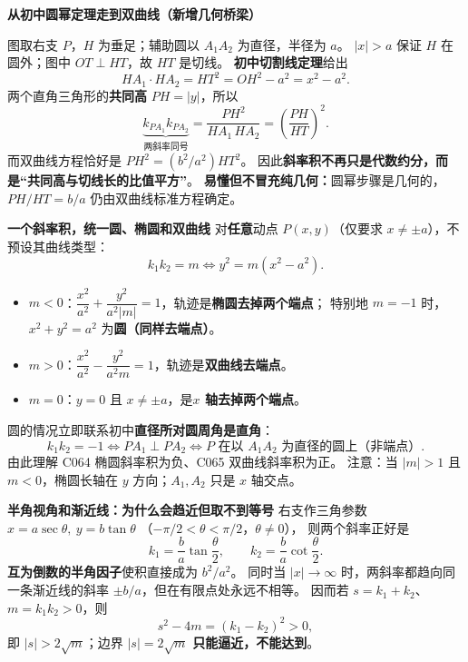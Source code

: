 \begin{explanationbox}
\textbf{\textcolor{CExplanation}{从初中圆幂定理走到双曲线（新增几何桥梁）}}
\begin{center}\end{center}
图取右支 $P$，$H$ 为垂足；辅助圆以 $A_1A_2$ 为直径，半径为 $a$。
$|x|>a$ 保证 $H$ 在圆外；图中 $OT\perp HT$，故 $HT$ 是切线。
\textbf{初中切割线定理}给出
\[
 HA_1\cdot HA_2=HT^2=OH^2-a^2=x^2-a^2.
\]
两个直角三角形的\textbf{共同高} $PH=|y|$，所以
\[
 \underbrace{k_{PA_1}k_{PA_2}}_{\text{两斜率同号}}
 =\frac{PH^2}{HA_1\,HA_2}
 =\boxed{\left(\frac{PH}{HT}\right)^2}.
\]
而双曲线方程恰好是 $PH^2=(b^2/a^2)HT^2$。
因此\textbf{斜率积不再只是代数约分，而是“共同高与切线长的比值平方”}。
\textbf{易懂但不冒充纯几何：}圆幂步骤是几何的，$PH/HT=b/a$ 仍由双曲线标准方程确定。

\medskip
\end{explanationbox}
\clearpage
\begin{explanationbox}
\textbf{\textcolor{CExplanation}{一个斜率积，统一圆、椭圆和双曲线}}
对\textbf{任意}动点 $P(x,y)$（仅要求 $x\ne\pm a$），不预设其曲线类型：
\[
 k_1k_2=m\iff y^2=m(x^2-a^2).
\]
\begin{itemize}[leftmargin=*,itemsep=.22em]
 \item $m<0$：$\dfrac{x^2}{a^2}+\dfrac{y^2}{a^2|m|}=1$，轨迹是\textbf{椭圆去掉两个端点}；
 特别地 $m=-1$ 时，$x^2+y^2=a^2$ 为\textbf{圆（同样去端点）}。
 \item $m>0$：$\dfrac{x^2}{a^2}-\dfrac{y^2}{a^2m}=1$，轨迹是\textbf{双曲线去端点}。
 \item $m=0$：$y=0$ 且 $x\ne\pm a$，是\textbf{$x$ 轴去掉两个端点}。
\end{itemize}
圆的情况立即联系初中\textbf{直径所对圆周角是直角}：
\[
 k_1k_2=-1\iff PA_1\perp PA_2
 \iff P\text{ 在以 }A_1A_2\text{ 为直径的圆上（非端点）}.
\]
由此理解 C064 椭圆斜率积为负、C065 双曲线斜率积为正。
注意：当 $|m|>1$ 且 $m<0$，椭圆长轴在 $y$ 方向；$A_1,A_2$ 只是 $x$ 轴交点。

\medskip
\textbf{\textcolor{CExplanation}{半角视角和渐近线：为什么会趋近但取不到等号}}
右支作三角参数 $x=a\sec\theta,\ y=b\tan\theta$
（$-\pi/2<\theta<\pi/2$，$\theta\ne0$），
则两个斜率正好是
\[
 k_1=\frac ba\tan\frac\theta2,\qquad
 k_2=\frac ba\cot\frac\theta2.
\]
\textbf{互为倒数的半角因子}使积直接成为 $b^2/a^2$。
同时当 $|x|\to\infty$ 时，两斜率都趋向同一条渐近线的斜率
$\pm b/a$，但在有限点处永远不相等。
因而若 $s=k_1+k_2$、$m=k_1k_2>0$，则
\[
 s^2-4m=(k_1-k_2)^2>0,
\]
即 $|s|>2\sqrt m$；边界 $|s|=2\sqrt m$ \textbf{只能逼近，不能达到}。

\end{explanationbox}
